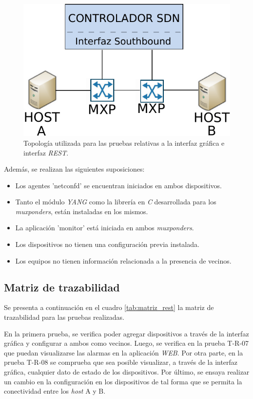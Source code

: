 \begin{figure}[H]
	\centering
	\includegraphics[scale=0.8]{Figures/topologiatest.pdf}
	\caption{Topología utilizada para las pruebas relativas a la interfaz gráfica e interfaz \textit{REST}.}
	\label{fig:test_topo_rest}
  \end{figure}


  Además, se realizan las siguientes suposiciones:

\begin{itemize}
	\item Los agentes 'netconfd' se encuentran iniciados en ambos dispositivos.
    \item Tanto el módulo \textit{YANG} como la librería en \textit{C} desarrollada para los \textit{muxponders}, están instaladas en los mismos.
    \item La aplicación 'monitor' está iniciada en ambos \textit{muxponders}.
    \item Los dispositivos no tienen una configuración previa instalada. 
    \item Los equipos no tienen información relacionada a la presencia de vecinos.
\end{itemize}


\subsection{Matriz de trazabilidad}

Se presenta a continuación en el cuadro \ref{tab:matriz_rest} la matriz de trazabilidad para las pruebas realizadas. 

En la primera prueba, se verifica poder agregar dispositivos a través de la interfaz gráfica y configurar a ambos como vecinos. 
Luego, se verifica en la prueba T-R-07 que puedan visualizarse las alarmas en la aplicación \textit{WEB}.
Por otra parte, en la prueba T-R-08 se comprueba que sea posible visualizar, a través de la interfaz gráfica, cualquier dato de estado de los dispositivos.
Por último, se ensaya realizar un cambio en la configuración en los dispositivos de tal forma que se permita la conectividad entre los \textit{host} A y B.
\\


